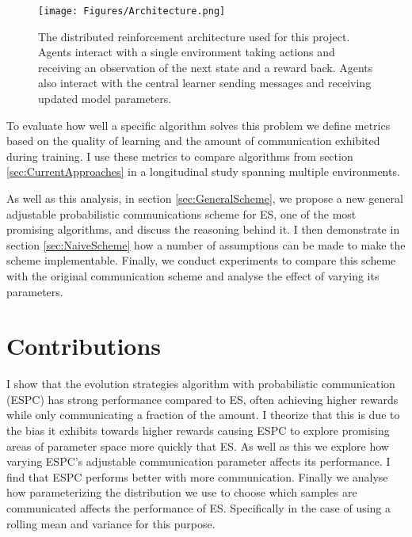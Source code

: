 \begin{figure}
    \centering
    \texttt{[image: Figures/Architecture.png]}
    \caption{The distributed reinforcement architecture used for this project. Agents interact with a single environment taking actions and receiving an observation of the next state and a reward back. Agents also interact with the central learner sending messages and receiving updated model parameters.}
    \label{fig:Architecture}
\end{figure}
To evaluate how well a specific algorithm solves this problem we define metrics based on the quality of learning and the amount of communication exhibited during training.
I use these metrics to compare algorithms from section \ref{sec:CurrentApproaches} in a longitudinal study spanning multiple environments. 

As well as this analysis, in section \ref{sec:GeneralScheme}, we propose a new general adjustable probabilistic communications scheme for ES, one of the most promising algorithms, and discuss the reasoning behind it. I then demonstrate in section \ref{sec:NaiveScheme} how a number of assumptions can be made to make the scheme implementable.
Finally, we conduct experiments to compare this scheme with the original communication scheme and analyse the effect of varying its parameters. 

\section{Contributions}

I show that the evolution strategies algorithm with probabilistic communication (ESPC) has strong performance compared to ES, often achieving higher rewards while only communicating a fraction of the amount. I theorize that this is due to the bias it exhibits towards higher rewards causing ESPC to explore promising areas of parameter space more quickly that ES.
As well as this we explore how varying ESPC's adjustable communication parameter affects its performance. I find that ESPC performs better with more communication. Finally we analyse how parameterizing the distribution we use to choose which samples are communicated affects the performance of ES. Specifically in the case of using a rolling mean and variance for this purpose.
